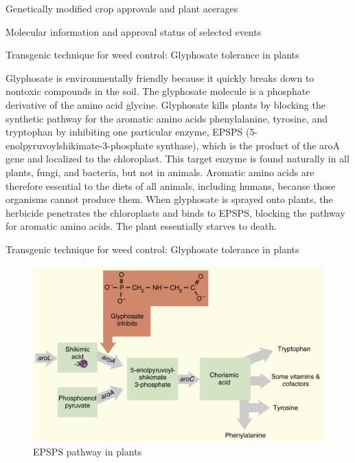 \documentclass[ignorenonframetext,aspectratio=169]{beamer}
\begin{document}
\begin{frame}{Genetically modified crop approvals and plant acerages}
\protect\hypertarget{genetically-modified-crop-approvals-and-plant-acerages}{}

\end{frame}

\begin{frame}{Molecular information and approval status of selected
events}
\protect\hypertarget{molecular-information-and-approval-status-of-selected-events}{}

\end{frame}

\begin{frame}{Transgenic technique for weed control: Glyphosate
tolerance in plants}
\protect\hypertarget{transgenic-technique-for-weed-control-glyphosate-tolerance-in-plants}{}

Glyphosate is environmentally friendly because it quickly breaks down to
nontoxic compounds in the soil. The glyphosate molecule is a phosphate
derivative of the amino acid glycine. Glyphosate kills plants by
blocking the synthetic pathway for the aromatic amino acids
phenylalanine, tyrosine, and tryptophan by inhibiting one particular
enzyme, EPSPS (5-enolpyruvoylshikimate-3-phosphate synthase), which is
the product of the aroA gene and localized to the chloroplast. This
target enzyme is found naturally in all plants, fungi, and bacteria, but
not in animals. Aromatic amino acids are therefore essential to the
diets of all animals, including humans, because those organisms cannot
produce them. When glyphosate is sprayed onto plants, the herbicide
penetrates the chloroplasts and binds to EPSPS, blocking the pathway for
aromatic amino acids. The plant essentially starves to death.

\end{frame}

\begin{frame}{Transgenic technique for weed control: Glyphosate
tolerance in plants}
\protect\hypertarget{transgenic-technique-for-weed-control-glyphosate-tolerance-in-plants-1}{}

\begin{figure}
\includegraphics[width=0.5\linewidth]{../images/epsps_pathway_plants} \caption{EPSPS pathway in plants}\label{fig:glyphosate-tolerance}
\end{figure}

\end{frame}
\end{document}
